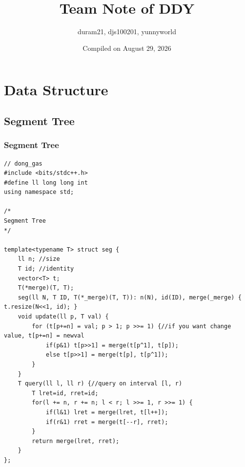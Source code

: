 \documentclass[landscape, 8pt, a4paper, oneside, twocolumn]{extarticle}
\title{Team Note of DDY}
\author{duram21, djs100201, yunnyworld}
\date{Compiled on August 29, 2026}
\begin{document}
{
    \Large
    \maketitle
    \tableofcontents
}
\thispagestyle{fancy}
\pagebreak
\section{Data Structure}
\subsection{Segment Tree}
\subsubsection {Segment Tree}
\begin{verbatim}
// dong_gas
#include <bits/stdc++.h>
#define ll long long int
using namespace std;

/*
Segment Tree
*/

template<typename T> struct seg {
    ll n; //size
    T id; //identity
    vector<T> t;
    T(*merge)(T, T);
    seg(ll N, T ID, T(*_merge)(T, T)): n(N), id(ID), merge(_merge) { t.resize(N<<1, id); }                  
    void update(ll p, T val) {
        for (t[p+=n] = val; p > 1; p >>= 1) {//if you want change value, t[p+=n] = newval
            if(p&1) t[p>>1] = merge(t[p^1], t[p]);
            else t[p>>1] = merge(t[p], t[p^1]);
        }
    }
    T query(ll l, ll r) {//query on interval [l, r)
        T lret=id, rret=id;
        for(l += n, r += n; l < r; l >>= 1, r >>= 1) {
            if(l&1) lret = merge(lret, t[l++]);
            if(r&1) rret = merge(t[--r], rret);
        }
        return merge(lret, rret);
    }
};
\end{verbatim}
\end{document}
